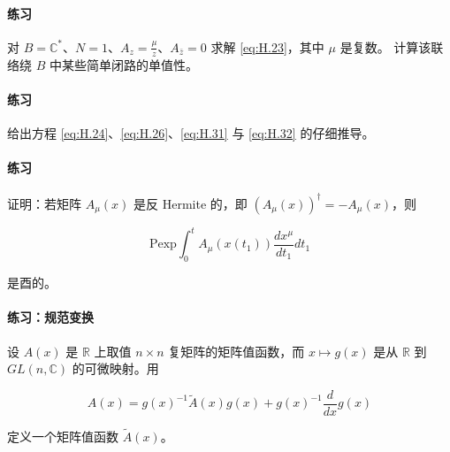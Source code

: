 
\paragraph{练习}
对 $B=\mathbb{C}^*$、$N=1$、$A_z=\frac{\mu}{z}$、$A_{\bar z}=0$ 求解 \eqref{eq:H.23}，其中 $\mu$ 是复数。
计算该联络绕 $B$ 中某些简单闭路的单值性。

\paragraph{练习}
给出方程 \eqref{eq:H.24}、\eqref{eq:H.26}、\eqref{eq:H.31} 与 \eqref{eq:H.32} 的仔细推导。

\paragraph{练习}
证明：若矩阵 $A_\mu(x)$ 是反 Hermite 的，即 $(A_\mu(x))^{\dagger}=-A_\mu(x)$，则

\begin{equation}
  \mathrm{Pexp}\int_0^t A_\mu(x(t_1))\frac{dx^\mu}{dt_1}dt_1
  \tag{H.34}
  \label{eq:H.34}
\end{equation}

是酉的。

\paragraph{练习：规范变换}
设 $A(x)$ 是 $\mathbb{R}$ 上取值 $n\times n$ 复矩阵的矩阵值函数，而 $x\mapsto g(x)$ 是从 $\mathbb{R}$
到 $GL(n,\mathbb{C})$ 的可微映射。用

\begin{equation}
  A(x) = g(x)^{-1}\widetilde{A}(x)g(x) + g(x)^{-1}\frac{d}{dx}g(x)
  \tag{H.35}
  \label{eq:H.35}
\end{equation}

定义一个矩阵值函数 $\widetilde{A}(x)$。

